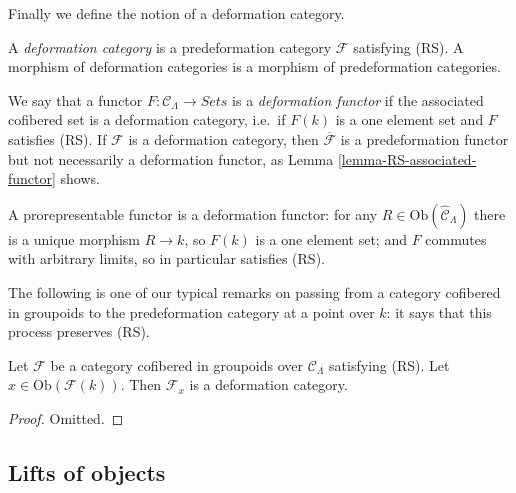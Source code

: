 \noindent
Finally we define the notion of a deformation category.

\begin{definition}
\label{definition-deformation-category}
A {\it deformation category} is a predeformation category $\mathcal{F}$ 
satisfying (RS).  A morphism of deformation categories is a morphism of 
predeformation categories.
\end{definition}

\begin{remark}
\label{remark-deformation-functor}
We say that a functor $F: \mathcal{C}_\Lambda \to \textit{Sets}$ 
is a {\it deformation functor} if the associated cofibered set is a 
deformation category, i.e.\ if $F(k)$ is a one element set and $F$ satisfies 
(RS).  If $\mathcal{F}$ is a deformation category, then $\overline{\mathcal{F}}$ 
is a predeformation functor but not necessarily a deformation functor, as
Lemma \ref{lemma-RS-associated-functor} shows.
\end{remark}

\begin{example}
\label{example-prorepresentable-deformation-functor}
A prorepresentable functor is a deformation functor: for any $R \in 
\text{Ob}(\widehat{\mathcal{C}}_\Lambda)$ there is a unique morphism $R 
\to k$, so $F(k)$ is a one element set; and $F$ commutes with arbitrary 
limits, so in particular satisfies (RS).
\end{example}

\noindent
The following is one of our typical remarks on passing from a category 
cofibered in groupoids to the predeformation category at a point over $k$: it 
says that this process preserves (RS).

\begin{lemma}
\label{lemma-localize-RS}
Let $\mathcal{F}$ be a category cofibered in groupoids over $\mathcal 
C_\Lambda$ satisfying (RS). Let $x \in \text{Ob}(\mathcal 
F(k))$.  Then $\mathcal{F}_{x}$ is a deformation category.
\end{lemma}

\begin{proof}
Omitted.
\end{proof}

\subsection{Lifts of objects}
\label{subsection-lifts}

